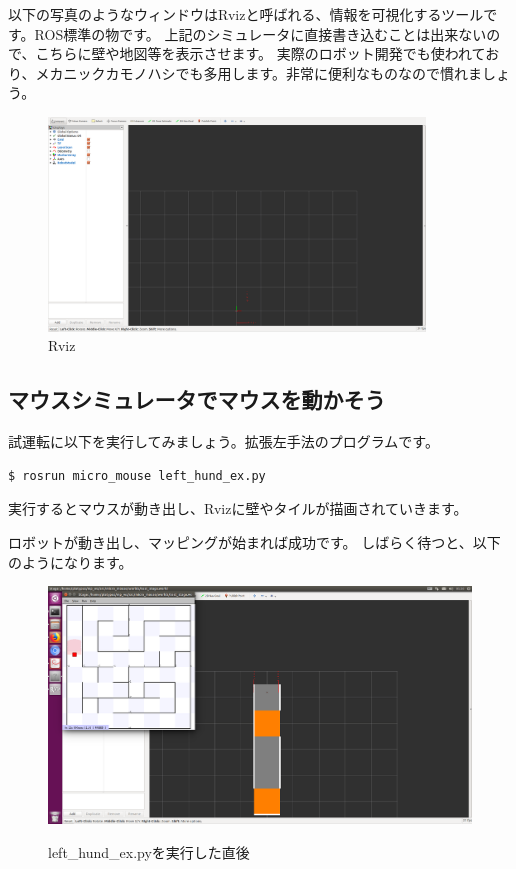 \documentclass[11pt,a4paper]{jsarticle}
\begin{document}
以下の写真のようなウィンドウはRvizと呼ばれる、情報を可視化するツールです。ROS標準の物です。
上記のシミュレータに直接書き込むことは出来ないので、こちらに壁や地図等を表示させます。
実際のロボット開発でも使われており、メカニックカモノハシでも多用します。非常に便利なものなので慣れましょう。
\begin{figure}[h]
  \begin{center}
    \includegraphics[width=100mm]{./mms_rviz.png}
  \end{center}
  \label{mms_simulator}
  \caption{Rviz}
\end{figure}



\subsection{マウスシミュレータでマウスを動かそう}

試運転に以下を実行してみましょう。拡張左手法のプログラムです。
\begin{lstlisting}[frame=single]
$ rosrun micro_mouse left_hund_ex.py
\end{lstlisting}

実行するとマウスが動き出し、Rvizに壁やタイルが描画されていきます。

ロボットが動き出し、マッピングが始まれば成功です。
しばらく待つと、以下のようになります。
\begin{figure}[h]
  \begin{center}
    \includegraphics[width=128mm]{./mms_test_pause.png}
  \end{center}
  \label{mms_simulator}
  \caption{left\_hund\_ex.pyを実行した直後}
  \caption{}
  \label{test}
\end{figure}
\end{document}
